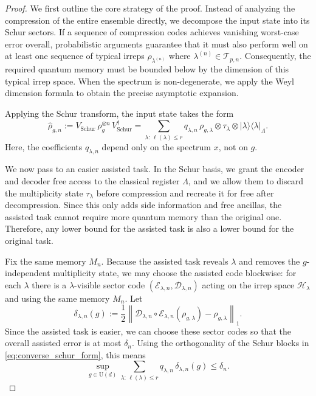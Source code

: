 \documentclass[a4paper,onecolumn,11pt]{quantumarticle}
\def\h{\mathcal{H}}
\begin{document}
\begin{proof}
We first outline the core strategy of the proof. Instead of analyzing the compression of the entire ensemble directly, we decompose the input state into its Schur sectors. If a sequence of compression codes achieves vanishing worst-case error overall, probabilistic arguments guarantee that it must also perform well on at least one sequence of typical irreps $\rho_{\lambda^{(n)}}$ where $\lambda^{(n)} \in \mathcal T_{p,n}$. Consequently, the required quantum memory must be bounded below by the dimension of this typical irrep space. When the spectrum is non-degenerate, we apply the Weyl dimension formula to obtain the precise asymptotic expansion.

Applying the Schur transform, the input state takes the form
\begin{equation}\label{eq:converse_schur_form}
    \widehat\rho_{g,n}
    := 
    V_{\mathrm{Schur}}\, \rho_g^{\otimes n}\, V_{\mathrm{Schur}}^\dagger
    =
    \sum_{\lambda:\,\ell(\lambda)\le r}
    q_{\lambda,n}\,
    \rho_{g,\lambda}\otimes \tau_\lambda \otimes |\lambda\rangle\!\langle \lambda|_\Lambda .
\end{equation}
Here, the coefficients $q_{\lambda,n}$ depend only on the spectrum $x$, not on $g$.

We now pass to an easier assisted task.
In the Schur basis, we grant the encoder and decoder free access to the classical register $\Lambda$, and we allow them to discard the multiplicity state $\tau_\lambda$ before compression and recreate it for free after decompression.
Since this only adds side information and free ancillas, the assisted task cannot require more quantum memory than the original one.
Therefore, any lower bound for the assisted task is also a lower bound for the original task.

Fix the same memory $M_n$.
Because the assisted task reveals $\lambda$ and removes the $g$-independent multiplicity state, we may choose the assisted code blockwise:
for each $\lambda$ there is a $\lambda$-visible sector code $(\mathcal E_{\lambda,n},\mathcal D_{\lambda,n})$ acting on the irrep space $\h_\lambda$ and using the same memory $M_n$.
Let
\begin{equation}
    \delta_{\lambda,n}(g):= 
    \frac12\left\|
        \mathcal D_{\lambda,n}\circ \mathcal E_{\lambda,n}(\rho_{g,\lambda})
        -
        \rho_{g,\lambda}
    \right\|_1 .
\end{equation}
Since the assisted task is easier, we can choose these sector codes so that the overall assisted error is at most $\delta_n$.
Using the orthogonality of the Schur blocks in \eqref{eq:converse_schur_form}, this means
\begin{equation}\label{eq:sector_error_average}
    \sup_{g\in \mathrm U(d)}
    \sum_{\lambda:\,\ell(\lambda)\le r}
    q_{\lambda,n}\, \delta_{\lambda,n}(g)
    \le \delta_n .
\end{equation}


\end{proof}
\end{document}
